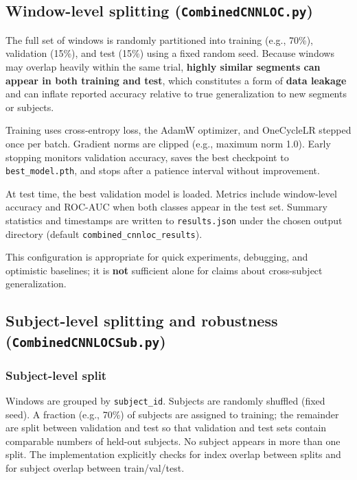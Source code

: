 \documentclass[11pt,a4paper]{article}
\newcommand{\py}[1]{\texttt{#1}}
\begin{document}
\subsection{Window-level splitting (\py{CombinedCNNLOC.py})}
\label{sec:window_split}

The full set of windows is randomly partitioned into training (e.g., 70\%), validation (15\%), and test (15\%) using a fixed random seed. Because windows may overlap heavily within the same trial, \textbf{highly similar segments can appear in both training and test}, which constitutes a form of \textbf{data leakage} and can inflate reported accuracy relative to true generalization to new segments or subjects.

Training uses cross-entropy loss, the AdamW optimizer, and OneCycleLR stepped once per batch. Gradient norms are clipped (e.g., maximum norm 1.0). Early stopping monitors validation accuracy, saves the best checkpoint to \py{best\_model.pth}, and stops after a patience interval without improvement.

At test time, the best validation model is loaded. Metrics include window-level accuracy and ROC-AUC when both classes appear in the test set. Summary statistics and timestamps are written to \py{results.json} under the chosen output directory (default \py{combined\_cnnloc\_results}).

This configuration is appropriate for quick experiments, debugging, and optimistic baselines; it is \textbf{not} sufficient alone for claims about cross-subject generalization.

\subsection{Subject-level splitting and robustness (\py{CombinedCNNLOCSub.py})}
\label{sec:subject}

\subsubsection{Subject-level split}

Windows are grouped by \texttt{subject\_id}. Subjects are randomly shuffled (fixed seed). A fraction (e.g., 70\%) of subjects are assigned to training; the remainder are split between validation and test so that validation and test sets contain comparable numbers of held-out subjects. No subject appears in more than one split. The implementation explicitly checks for index overlap between splits and for subject overlap between train/val/test.
\end{document}
